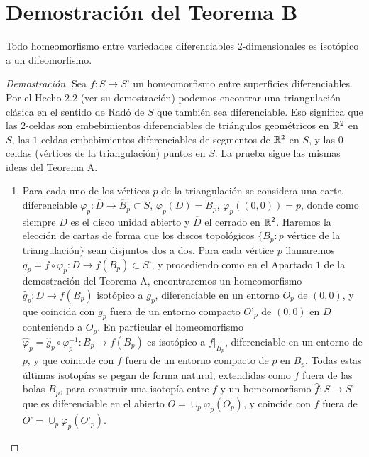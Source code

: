 \section{Demostración del Teorema B}
	\begin{teorb}
		Todo homeomorfismo entre variedades diferenciables 2-dimensionales es isotópico a un difeomorfismo.
	\end{teorb}
	\begin{proof}[Demostración]
		Sea $f:S\to S’$ un homeomorfismo entre superficies diferenciables. Por el Hecho $2.2$ (ver su demostración) podemos encontrar una triangulación clásica en el sentido de Radó de $S$ que también sea diferenciable. Eso significa que las $2$-celdas son embebimientos diferenciables de triángulos geométricos en $\mathbb{R}^2$ en $S$, las  $1$-celdas embebimientos diferenciables de segmentos de $\mathbb{R}^2$ en $S$, y las $0$-celdas (vértices de la triangulación) puntos en $S$. La prueba sigue las mismas ideas del Teorema A.
	\begin{enumerate}
		\item Para cada uno de los vértices $p$ de la triangulación se considera una carta diferenciable $\varphi_p : \overline{D}\to \overline{B}_p\subset S$, $\varphi_p(D)=B_p$, $\varphi_p((0,0))=p$, donde como siempre $D$ es el disco unidad abierto y $ \overline{D}$ el cerrado en $\mathbb{R}^2$. Haremos la elección de cartas de forma que los discos topológicos $\{\overline{B}_p \colon p$ vértice de la triangulación$\}$ sean disjuntos dos a dos. Para cada vértice $p$ llamaremos $g_p=f\circ \varphi_p:D\to f(B_p)\subset S’$, y procediendo como en el Apartado $1$ de la demostración del Teorema A, encontraremos un homeomorfismo $\hat g_p:D\to f(B_p)$ isotópico a  $g_p$, diferenciable en un entorno $O_p$ de $(0,0)$, y que coincida con $g_p$ fuera de un entorno compacto $O’_p$  de $(0,0)$ en $D$ conteniendo a $O_p$. En particular el homeomorfismo $\hat \varphi_p=\hat g_p\circ \varphi_p^{-1}:B_p\to f(B_p)$ es isotópico a  $f|_{B_p}$, diferenciable en un entorno de $p$, y que coincide con $f$ fuera de un entorno compacto de $p$ en $B_p$. Todas estas últimas isotopías se pegan de forma natural, extendidas como $f$ fuera de las bolas $B_p$, para construir una isotopía entre $f$ y un homeomorfismo $\hat f\colon S\to S’$ que es diferenciable en el abierto  $O=\cup_p \varphi_p(O_p)$, y coincide con $f$ fuera de  $O’=\cup_p \varphi_p(O’_p)$.


\end{enumerate}
\end{proof}
